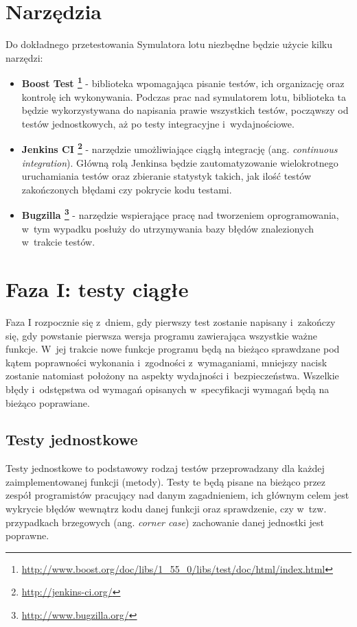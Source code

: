 \documentclass{mwrep}
\begin{document}
\chapter{Narzędzia}
Do dokładnego przetestowania Symulatora lotu niezbędne będzie użycie kilku narzędzi:
\begin{itemize}
\item \textbf{Boost Test \footnote{\url{http://www.boost.org/doc/libs/1\_55\_0/libs/test/doc/html/index.html}}} - biblioteka  wpomagająca pisanie testów, ich organizację oraz kontrolę ich wykonywania. Podczas prac nad symulatorem lotu, biblioteka ta będzie wykorzystywana do napisania prawie wszystkich testów, począwszy od testów jednostkowych, aż po testy integracyjne i~wydajnościowe.
\item \textbf{Jenkins CI \footnote{\url{http://jenkins-ci.org/}}} - narzędzie umożliwiające ciągłą integrację (ang. \textit{continuous integration}). Główną rolą Jenkinsa będzie zautomatyzowanie wielokrotnego uruchamiania testów oraz zbieranie statystyk takich, jak ilość testów zakończonych błędami czy pokrycie kodu testami.
\item \textbf{Bugzilla \footnote{\url{http://www.bugzilla.org/}}} - narzędzie wspierające pracę nad tworzeniem oprogramowania, w~tym wypadku posłuży do utrzymywania bazy błędów znalezionych w~trakcie testów.
\end{itemize}

\chapter{Faza I: testy ciągłe}
Faza I rozpocznie się z~dniem, gdy pierwszy test zostanie napisany i~zakończy się, gdy powstanie pierwsza wersja programu zawierająca \linebreak wszystkie ważne funkcje. W~jej trakcie nowe funkcje programu będą na bieżąco sprawdzane pod kątem poprawności wykonania i~zgodności z~wymaganiami, mniejszy nacisk zostanie natomiast położony na aspekty wydajności i~bezpieczeństwa. Wszelkie błędy i~odstępstwa od wymagań opisanych w~specyfikacji wymagań będą na bieżąco poprawiane.

\section{Testy jednostkowe}
Testy jednostkowe to podstawowy rodzaj testów przeprowadzany dla każdej zaimplementowanej funkcji (metody). Testy te będą pisane na bieżąco przez zespół programistów pracujący nad danym zagadnieniem, ich głównym celem jest wykrycie błędów wewnątrz kodu danej funkcji oraz sprawdzenie, czy w~tzw. przypadkach brzegowych (ang. \textit{corner case}) zachowanie danej jednostki jest poprawne.
\end{document}
